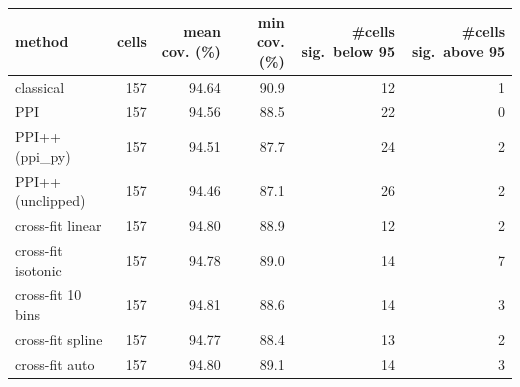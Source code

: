 \begin{tabular}{lrrrrr}
\toprule
method & cells & mean cov. (\%) & min cov. (\%) & \#cells sig.\ below 95 & \#cells sig.\ above 95\\
\midrule
classical & 157 & 94.64 & 90.9 & 12 & 1\\
PPI & 157 & 94.56 & 88.5 & 22 & 0\\
PPI++ (ppi\_py) & 157 & 94.51 & 87.7 & 24 & 2\\
PPI++ (unclipped) & 157 & 94.46 & 87.1 & 26 & 2\\
cross-fit linear & 157 & 94.80 & 88.9 & 12 & 2\\
cross-fit isotonic & 157 & 94.78 & 89.0 & 14 & 7\\
cross-fit 10 bins & 157 & 94.81 & 88.6 & 14 & 3\\
cross-fit spline & 157 & 94.77 & 88.4 & 13 & 2\\
cross-fit auto & 157 & 94.80 & 89.1 & 14 & 3\\
\bottomrule
\end{tabular}